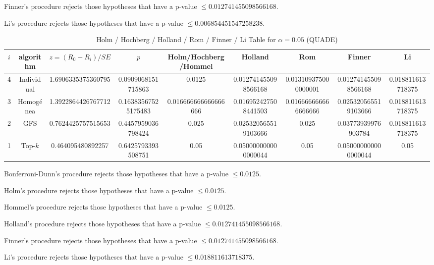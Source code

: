 \documentclass[a4paper,10pt]{article}
\begin{document}
\begin{landscape}
Finner's procedure rejects those hypotheses that have a p-value $\le0.012741455098566168$.


Li's procedure rejects those hypotheses that have a p-value $\le0.006854451547258238$.



\newpage

\begin{table}[!htp]
\centering\scriptsize
\caption{Holm / Hochberg / Holland / Rom / Finner / Li Table for $\alpha=0.05$ (QUADE)}
\begin{tabular}{ccccccccc}
$i$&algorithm&$z=(R_0 - R_i)/SE$&$p$&Holm/Hochberg/Hommel&Holland&Rom&Finner&Li\\
\hline
4&Individual&1.6906335375360795&0.0909068151715863&0.0125&0.012741455098566168&0.013109375000000001&0.012741455098566168&0.018811613718375\\
3&Homogénea&1.3922864426767712&0.16383567525175483&0.016666666666666666&0.016952427508441503&0.016666666666666666&0.025320565519103666&0.018811613718375\\
2&GFS&0.7624425757515653&0.4457959036798424&0.025&0.025320565519103666&0.025&0.03773939976903784&0.018811613718375\\
1&Top-$k$&0.464095480892257&0.6425793393508751&0.05&0.050000000000000044&0.05&0.050000000000000044&0.05\\
\hline
\end{tabular}
\end{table}
Bonferroni-Dunn's procedure rejects those hypotheses that have a p-value $\le0.0125$.


Holm's procedure rejects those hypotheses that have a p-value $\le0.0125$.


Hommel's procedure rejects those hypotheses that have a p-value $\le0.0125$.


Holland's procedure rejects those hypotheses that have a p-value $\le0.012741455098566168$.


Finner's procedure rejects those hypotheses that have a p-value $\le0.012741455098566168$.


Li's procedure rejects those hypotheses that have a p-value $\le0.018811613718375$.



\newpage


\end{landscape}
\end{document}
